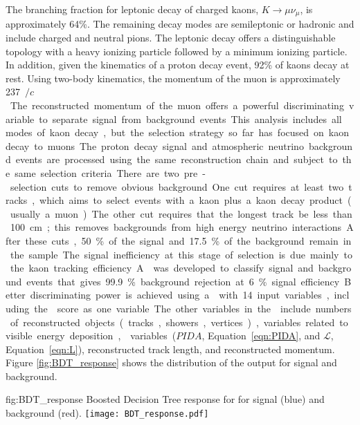 The branching fraction for leptonic decay of charged kaons, $K\rightarrow \mu \nu_{\mu}$, is approximately \num{64}\%. The remaining decay modes are semileptonic or hadronic and include charged and neutral pions. The leptonic decay offers a distinguishable topology with a heavy ionizing particle followed by a minimum ionizing particle. In addition, given the kinematics of a proton decay event, \num{92}\% of kaons decay at rest. Using two-body kinematics, the momentum of the muon is approximately \SI{237}{\MeV$/c$}. The reconstructed momentum of the muon offers a powerful discriminating variable to separate signal from background events.  This analysis includes all modes of kaon decay, but the selection strategy so far has focused on kaon decay to muons.

The proton decay signal and atmospheric neutrino background events are processed using the same reconstruction chain and subject to the same selection criteria. There are two pre-selection cuts to remove obvious background. One cut requires at least two tracks, which aims to select events with a kaon plus a kaon decay product (usually a muon).  The other cut requires that the longest track be less than \SI{100}{\cm}; this removes backgrounds from high energy neutrino interactions.  After these cuts, \num{50}\% of the signal and \num{17.5}\% of the background remain in the sample.  The signal inefficiency at this stage of selection is due mainly to the kaon tracking efficiency.

A  was developed to classify signal and background events that gives \num{99.9}\% background rejection at \num{6}\% signal efficiency.  Better discriminating power is achieved using a  with \num{14} input variables, including the  score as one  variable.  The other variables in the  include numbers of reconstructed objects (tracks, showers, vertices), variables related to visible energy deposition,  variables ($PIDA$, Equation~\ref{eqn:PIDA}, and $\mathcal{L}$, Equation~\ref{eqn:L}), reconstructed track length, and reconstructed momentum.
Figure \ref{fig:BDT_response} shows the distribution of the  output for signal and background.

\begin{dunefigure}
{fig:BDT_response}
{Boosted Decision Tree response for \ptoknubar for signal (blue) and background (red).}
\texttt{[image: BDT\_response.pdf]}
\end{dunefigure} 

